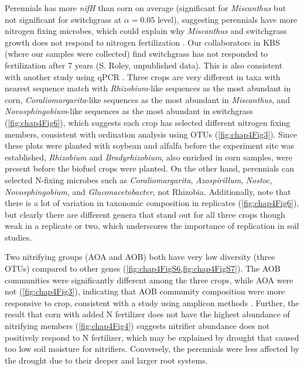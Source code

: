 \documentclass[]{msu-thesis}
\begin{document}
Perennials has more \textit{nifH} than corn on average (significant for
\textit{Miscanthus} but not significant for switchgrass at $\alpha = 0.05$
level), suggesting perennials have more nitrogen fixing microbes, which could
explain why \textit{Miscanthus} and switchgrass growth does not respond to
nitrogen fertilization \cite{schwarz_effect_1994,parrish_biology_2005}. Our
collaborators in KBS (where our samples were collected) find switchgrass has
not responded to fertilization after 7 years (S. Roley, unpublished data). This
is also consistent with another study using qPCR \cite{mao_impact_2013}. Three
crops are very different in taxa with nearest sequence match with
\textit{Rhizobium}-like sequences as the most abundant in corn,
\textit{Coraliomargarita}-like sequences as the most abundant in
\textit{Miscanthus}, and \textit{Novosphingobium}-like sequences  as the most
abundant in switchgrass (\cref{fig:chap4Fig6}), which suggests each crop has
selected different nitrogen fixing members, consistent with ordination analysis
using OTUs (\cref{fig:chap4Fig3}). Since these plots were planted with soybean
and alfalfa before the experiment site was established, \textit{Rhizobium} and
\textit{Bradyrhizobium}, also enriched in corn samples, were present before the
biofuel crops were planted. On the other hand, perennials can selected N-fixing
microbes such as \textit{Coraliomargarita}, \textit{Azospirillum},
\textit{Nostoc}, \textit{Novosphingobium}, and \textit{Gluconacetobacter}, not
Rhizobia. Additionally, note that there is a lot of variation in taxonomic
composition in replicates (\cref{fig:chap4Fig6}), but clearly there are
different genera that stand out for all three crops though weak in a replicate
or two, which underscores the importance of replication in soil studies.

Two nitrifying groups (AOA and AOB) both have very low diversity (three OTUs)
compared to other genes (\cref{fig:chap4FigS6,fig:chap4FigS7}). The AOB
communities were significantly different among the three crops, while AOA were
not (\cref{fig:chap4Fig3}), indicating that AOB community composition were more
responsive to crop, consistent with a study using amplicon methods
\cite{shen_abundance_2008,wang_community_2009}. Further, the result that corn
with added N fertilizer does not have the highest abundance of nitrifying
members (\cref{fig:chap4Fig4}) suggests nitrifier abundance does not positively
respond to N fertilizer, which may be explained by drought that caused too low
soil moisture for nitrifiers. Conversely, the perennials were less affected by
the drought due to their deeper and larger root systems.
\end{document}

